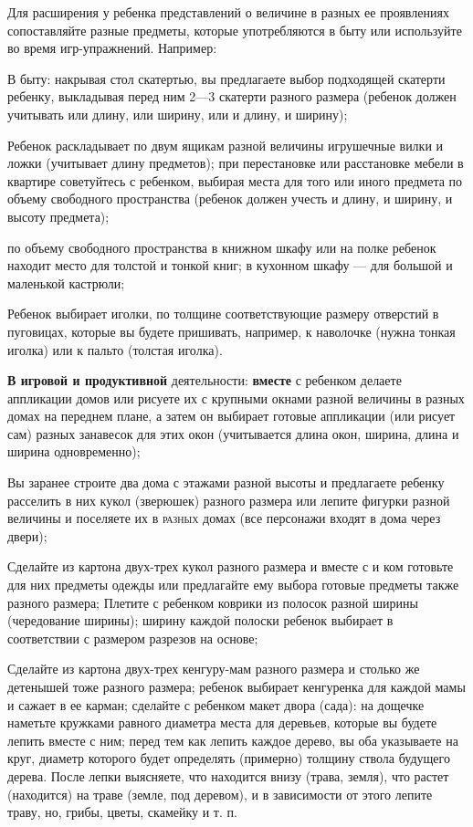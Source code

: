 \documentclass[a5paper]{book}
\begin{document}
Для расширения у ребенка представлений о величине в разных ее
проявлениях сопоставляйте разные предметы, которые употребляются в быту
или используйте во время игр-упражнений. Например:

В быту: накрывая стол скатертью, вы предлагаете выбор подходящей
скатерти ребенку, выкладывая перед ним 2---3 скатерти разного размера
(ребенок должен учитывать или длину, или ширину, или и длину, и ширину);

Ребенок раскладывает по двум ящикам разной величины игрушечные вилки и
ложки (учитывает длину предметов); при перестановке или расстановке
мебели в квартире советуйтесь с ребенком, выбирая места для того или
иного предмета по объему свободного пространства (ребенок должен учесть
и длину, и ширину, и высоту предмета);

по объему свободного пространства в книжном шкафу или на полке ребенок
находит место для толстой и тонкой книг; в кухонном шкафу --- для
большой и маленькой кастрюли;

Ребенок выбирает иголки, по толщине соответствующие размеру отверстий в
пуговицах, которые вы будете пришивать, например, к наволочке (нужна
тонкая иголка) или к пальто (толстая иголка).

\textbf{В игровой и продуктивной} деятельности: \textbf{вместе} с
ребенком делаете аппликации домов или рисуете их с крупными окнами
разной величины в разных домах на переднем плане, а затем он выбирает
готовые аппликации (или рисует сам) разных занавесок для этих окон
(учитывается длина окон, ширина, длина и ширина одновременно);

Вы заранее строите два дома с этажами разной высоты и предлагаете
ребенку расселить в них кукол (зверюшек) разного размера или лепите
фигурки разной величины и поселяете их в \textsc{разных} домах (все
персонажи входят в дома через двери);

Сделайте из картона двух-трех кукол разного размера и вместе с и ком
готовьте для них предметы одежды или предлагайте ему выбора готовые
предметы также разного размера; Плетите с ребенком коврики из полосок
разной ширины (чередование ширины); ширину каждой полоски ребенок
выбирает в соответствии с размером разрезов на основе;

Сделайте из картона двух-трех кенгуру-мам разного размера и столько же
детенышей тоже разного размера; ребенок выбирает кенгуренка для каждой
мамы и сажает в ее карман; сделайте с ребенком макет двора (сада): на
дощечке наметьте кружками равного диаметра места для деревьев, которые
вы будете лепить вместе с ним; перед тем как лепить каждое дерево, вы
оба указываете на круг, диаметр которого будет определять (примерно)
толщину ствола будущего дерева. После лепки выясняете, что находится
внизу (трава, земля), что растет (находится) на траве (земле, под
деревом), и в зависимости от этого лепите траву, но, грибы, цветы,
скамейку и т. п.
\end{document}
